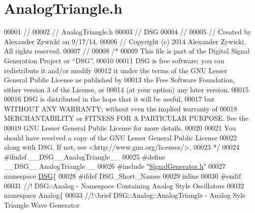 \hypertarget{_analog_triangle_8h_source}{\section{Analog\+Triangle.\+h}
\label{_analog_triangle_8h_source}
}

\begin{DoxyCode}
00001 \textcolor{comment}{//}
00002 \textcolor{comment}{//  AnalogTriangle.h}
00003 \textcolor{comment}{//  DSG}
00004 \textcolor{comment}{//}
00005 \textcolor{comment}{//  Created by Alexander Zywicki on 9/17/14.}
00006 \textcolor{comment}{//  Copyright (c) 2014 Alexander Zywicki. All rights reserved.}
00007 \textcolor{comment}{//}
00008 \textcolor{comment}{/*}
00009 \textcolor{comment}{ This file is part of the Digital Signal Generation Project or “DSG”.}
00010 \textcolor{comment}{}
00011 \textcolor{comment}{ DSG is free software: you can redistribute it and/or modify}
00012 \textcolor{comment}{ it under the terms of the GNU Lesser General Public License as published by}
00013 \textcolor{comment}{ the Free Software Foundation, either version 3 of the License, or}
00014 \textcolor{comment}{ (at your option) any later version.}
00015 \textcolor{comment}{}
00016 \textcolor{comment}{ DSG is distributed in the hope that it will be useful,}
00017 \textcolor{comment}{ but WITHOUT ANY WARRANTY; without even the implied warranty of}
00018 \textcolor{comment}{ MERCHANTABILITY or FITNESS FOR A PARTICULAR PURPOSE.  See the}
00019 \textcolor{comment}{ GNU Lesser General Public License for more details.}
00020 \textcolor{comment}{}
00021 \textcolor{comment}{ You should have received a copy of the GNU Lesser General Public License}
00022 \textcolor{comment}{ along with DSG.  If not, see <http://www.gnu.org/licenses/>.}
00023 \textcolor{comment}{ */}
00024 \textcolor{preprocessor}{#ifndef \_\_DSG\_\_AnalogTriangle\_\_}
00025 \textcolor{preprocessor}{#define \_\_DSG\_\_AnalogTriangle\_\_}
00026 \textcolor{preprocessor}{#include "\hyperlink{_signal_generator_8h}{SignalGenerator.h}"}
00027 \textcolor{keyword}{namespace }\hyperlink{namespace_d_s_g}{DSG}\{
00028 \textcolor{preprocessor}{#ifdef DSG\_Short\_Names}
00029     \textcolor{keyword}{inline}
00030 \textcolor{preprocessor}{#endif}
00031 \textcolor{comment}{    //! DSG::Analog - Namespace Containing Analog Style Oscillators}
00032 \textcolor{comment}{}    \textcolor{keyword}{namespace }Analog\{\textcolor{comment}{}
00033 \textcolor{comment}{        //!\(\backslash\)brief DSG::Analog::AnalogTriangle - Analog Syle Triangle Wave Generator}

\end{DoxyCode}
